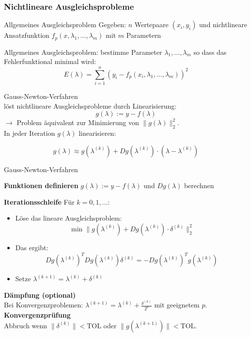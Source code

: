 \subsubsection{Nichtlineare Ausgleichsprobleme}

\begin{definition}{Allgemeines Ausgleichsproblem}
Gegeben: $n$ Wertepaare $(x_i, y_i)$ und nichtlineare Ansatzfunktion $f_p(x, \lambda_1, ..., \lambda_m)$ mit $m$ Parametern

Allgemeines Ausgleichsproblem: bestimme Parameter $\lambda_1, ..., \lambda_m$ so dass das Fehlerfunktional minimal wird:
\vspace{-3mm}\\
$$E(\lambda) = \sum_{i=1}^{n} (y_i - f_p(x_i, \lambda_1, ..., \lambda_m))^2$$
\end{definition}

\begin{concept}{Gauss-Newton-Verfahren}\\
löst nichtlineare Ausgleichsprobleme durch Linearisierung:
$$g(\lambda) := y - f(\lambda)$$
$\rightarrow$ Problem äquivalent zur Minimierung von $\|g(\lambda)\|_2^2$.
\vspace{2mm}\\
In jeder Iteration $g(\lambda)$ linearisieren:

$$g(\lambda) \approx g(\lambda^{(k)}) + Dg(\lambda^{(k)}) \cdot (\lambda - \lambda^{(k)})$$
\end{concept}

\begin{KR}{Gauss-Newton-Verfahren}

\textbf{Funktionen definieren}
$g(\lambda) := y - f(\lambda)$ und $Dg(\lambda)$ berechnen

\textbf{Iterationsschleife}
Für $k = 0, 1, ...$:
\begin{itemize}
    \item Löse das lineare Ausgleichsproblem: $$\min \|g(\lambda^{(k)}) + Dg(\lambda^{(k)}) \cdot \delta^{(k)}\|_2^2$$
    \item Das ergibt: $$Dg(\lambda^{(k)})^T Dg(\lambda^{(k)}) \delta^{(k)} = -Dg(\lambda^{(k)})^T g(\lambda^{(k)})$$
    \item Setze $\lambda^{(k+1)} = \lambda^{(k)} + \delta^{(k)}$
\end{itemize}
\vspace{1mm}

\textbf{Dämpfung (optional)}
\vspace{-1mm}\\
Bei Konvergenzproblemen: $\lambda^{(k+1)} = \lambda^{(k)} + \frac{\delta^{(k)}}{2^p}$ mit geeignetem $p$.
\vspace{1mm}\\
\textbf{Konvergenzprüfung}\\
Abbruch wenn $\|\delta^{(k)}\| < \text{TOL}$ oder $\|g(\lambda^{(k+1)})\| < \text{TOL}$.
\end{KR}

